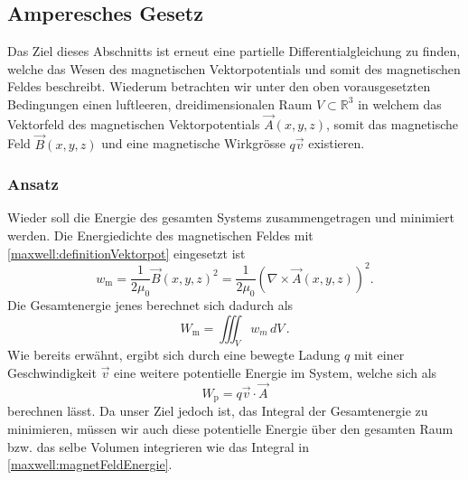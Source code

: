 

\subsection{Amperesches Gesetz}
Das Ziel dieses Abschnitts ist erneut eine partielle Differentialgleichung zu finden, welche das Wesen des magnetischen Vektorpotentials und somit des magnetischen Feldes beschreibt.
Wiederum betrachten wir unter den oben vorausgesetzten Bedingungen einen luftleeren, dreidimensionalen Raum $V \subset \mathbb{R}^3$ in welchem das Vektorfeld des magnetischen Vektorpotentials $\vec{A}(x,y,z)$, somit das magnetische Feld $\vec{B}(x,y,z)$ und eine magnetische Wirkgrösse $q\vec{v}$  existieren. 

\subsubsection{Ansatz}

Wieder soll die Energie des gesamten Systems zusammengetragen und minimiert werden. 
Die Energiedichte des magnetischen Feldes mit \eqref{maxwell:definitionVektorpot} eingesetzt ist
\[ w_{\text{m}} 
= 
\frac{1}{2\mu_0}\vec{B}(x,y,z)^2
=
\frac{1}{2\mu_0}\left(\nabla\times\vec{A}(x,y,z)\right)^2. \]
Die Gesamtenergie jenes berechnet sich dadurch als
\begin{equation}
	\label{maxwell:magnetFeldEnergie}
	W_{\text{m}} = \iiint_V w_m\, dV\,.
\end{equation}
Wie bereits erwähnt, ergibt sich durch eine bewegte Ladung $q$ mit einer Geschwindigkeit $\vec{v}$ eine weitere potentielle Energie im System, welche sich als 
\[ 
W_{\text{p}}
= 
q\vec{v}
\cdot
\vec{A}
 \]
berechnen lässt.
Da unser Ziel jedoch ist, das Integral der Gesamtenergie zu minimieren, müssen wir auch diese potentielle Energie über den gesamten Raum bzw. das selbe Volumen integrieren wie das Integral in \eqref{maxwell:magnetFeldEnergie}. 

